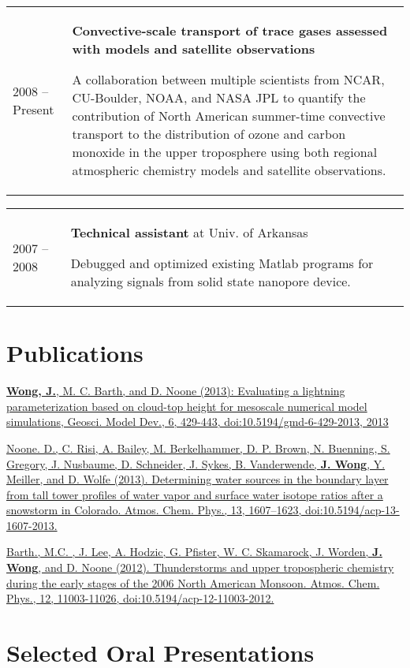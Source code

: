 \documentclass[overlap,12pt,centered]{res}
\makeatletter
\newcommand{\tabulated}{\begin{tabular}{@{}p{1.4in}p{4.9in}}}
\makeatother
\begin{document}
\begin{resume}
		\tabulated				
			2008 -- Present	&	{\bf Convective-scale transport of trace gases assessed with models and satellite observations}
				
				A collaboration between multiple scientists from NCAR, CU-Boulder, NOAA, and NASA JPL to quantify the contribution of North American summer-time convective transport to the distribution of ozone and carbon monoxide in the upper troposphere using both regional atmospheric chemistry models and satellite observations.
		\end{tabular}
		
		\tabulated				
			2007 -- 2008		&	{\bf Technical assistant} at Univ. of Arkansas
		
				Debugged and optimized existing Matlab programs for analyzing signals from solid state nanopore device.
		\end{tabular}
		
		
		\section{\sc Publications}
		\href{http://www.geosci-model-dev.net/6/429/2013/gmd-6-429-2013.html}{\textbf{Wong, J.}, M. C. Barth, and D. Noone (2013): Evaluating a lightning parameterization based on cloud-top height for mesoscale numerical model simulations, Geosci. Model Dev., 6, 429-443, doi:10.5194/gmd-6-429-2013, 2013}
		
		\href{http://www.atmos-chem-phys.net/13/1607/2013/acp-13-1607-2013.html}{Noone. D., C. Risi, A. Bailey, M. Berkelhammer, D. P. Brown, N. Buenning, S. Gregory, J. Nusbaume, D. Schneider, J. Sykes, B. Vanderwende, \textbf{J. Wong}, Y. Meiller, and D. Wolfe (2013). Determining water sources in the boundary layer from tall tower profiles of water vapor and surface water isotope ratios after a snowstorm in Colorado. Atmos. Chem. Phys., 13, 1607--1623, doi:10.5194/acp-13-1607-2013.}
		
		\href{http://www.atmos-chem-phys.net/12/11003/2012/acp-12-11003-2012.html}{Barth., M.C. , J. Lee, A. Hodzic, G. Pfister, W. C. Skamarock, J. Worden, \textbf{J. Wong}, and D. Noone (2012). Thunderstorms and upper tropospheric chemistry during the early stages of the 2006 North American Monsoon. Atmos. Chem. Phys., 12, 11003-11026, doi:10.5194/acp-12-11003-2012.}
		
		\section{\sc Selected Oral Presentations}
		

\end{resume}
\end{document}
